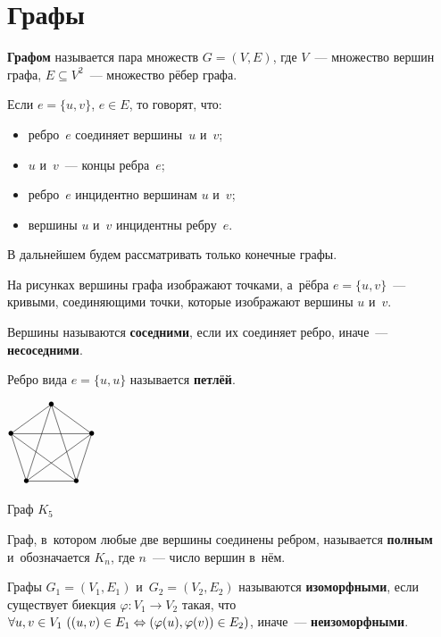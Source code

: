 \section{Графы}
\textbf{Графом} называется пара множеств $G = (V, E)$, где $V$~--- множество вершин графа, $E \subseteq V^2$~--- множество рёбер графа.

Если $e = \{ u, v \}$, $e \in E$, то говорят, что:
\begin{itemize}
	\item ребро~$e$ соединяет вершины~$u$ и~$v$;
	\item $u$ и~$v$~--- концы ребра~$e$;
	\item ребро~$e$ инцидентно вершинам $u$ и~$v$;
	\item вершины $u$ и~$v$ инцидентны ребру~$e$.
\end{itemize}

В дальнейшем будем рассматривать только конечные графы.

На рисунках вершины графа изображают точками, а~рёбра $e = \{ u, v \}$~--- кривыми, соединяющими точки, которые изображают вершины $u$ и~$v$.

Вершины называются \textbf{соседними}, если их соединяет ребро, иначе~--- \textbf{несоседними}.

Ребро вида $e = \{ u, u \}$ называется \textbf{петлёй}.

\begin{floatingfigure}{30mm}
\noindent
\begin{center}
$\begin{xy} /r0.4mm/:
(30, 60) = "1" *{\bullet}; %
(58.532, 39.271) = "2" *{\bullet}; %
(47.634, 5.729) = "3" *{\bullet}; %
(12.366, 5.729) = "4" *{\bullet}; %
(1.468, 39.271) = "5" *{\bullet}; %
"5"; "1" **@{-}; "2" **@{-}; "3" **@{-}; "4" **@{-}; "5" **@{-};
"2" **@{-}; "4" **@{-}; "1" **@{-}; "3" **@{-}; "5" **@{-};
\end{xy}$
\caption{Граф $K_5$}
\end{center}
\end{floatingfigure}

Граф, в~котором любые две вершины соединены ребром, называется \textbf{полным} и~обозначается $K_n$, где $n$~--- число вершин в~нём.

Графы $G_1 = (V_1, E_1)$ и~$G_2 = (V_2, E_2)$ называются \textbf{изоморфными}, если существует биекция $\varphi \colon V_1 \to V_2$ такая, что
$\forall u, v \in V_1 \ \allowbreak ((u, v) \in E_1 \opbr\Leftrightarrow (\varphi(u), \varphi(v)) \in E_2)$,
иначе~--- \textbf{неизоморфными}.

